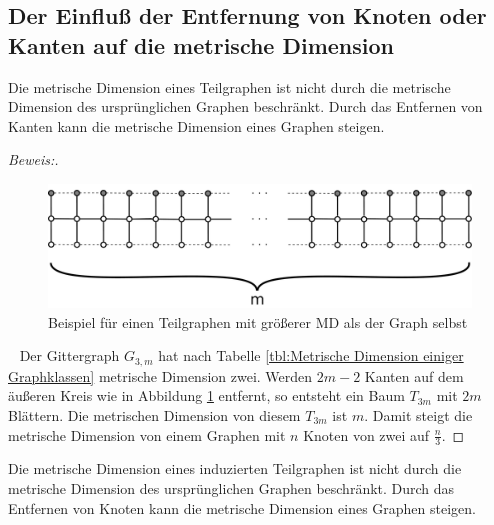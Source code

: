 \subsection{Der Einfluß der Entfernung von Knoten oder Kanten auf die metrische Dimension}
\begin{lem}
Die metrische Dimension eines Teilgraphen ist nicht durch die metrische Dimension des ursprünglichen Graphen beschränkt. Durch das Entfernen von Kanten kann die metrische Dimension eines Graphen steigen.
\end{lem}
\begin{proof}[Beweis:]$\;$
\begin{figure}[h!]
		\centering 		 
\includegraphics[width=420pt]{bilder/gitterzubaum.pdf}
   \caption{Beispiel für einen Teilgraphen mit größerer MD als der Graph selbst}
   \label{bild:Gitterbaum1}
\end{figure}
~ \linebreak
Der Gittergraph $G_{3,m}$ hat nach Tabelle \ref{tbl:Metrische Dimension einiger Graphklassen} metrische Dimension zwei. Werden $2m-2$ Kanten auf dem äußeren Kreis wie in Abbildung \ref{bild:Gitterbaum1} entfernt, so entsteht ein Baum $T_{3m}$ mit $2m$ Blättern. Die metrischen Dimension von diesem $T_{3m}$ ist $m$. Damit steigt die metrische Dimension von einem Graphen mit $n$ Knoten von zwei auf $\frac{n}{3}$.
\end{proof}
\begin{lem}
Die metrische Dimension eines induzierten Teilgraphen ist nicht durch die metrische Dimension des ursprünglichen Graphen beschränkt. Durch das Entfernen von Knoten kann die metrische Dimension eines Graphen steigen.
\end{lem}
